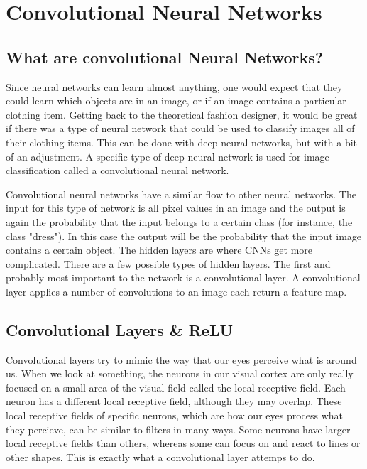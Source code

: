 \documentclass[12pt]{report} %
\begin{document}
\chapter{Convolutional Neural Networks}
\section{What are convolutional Neural Networks?}
	Since neural networks can learn almost anything, one would expect that they could learn which objects are in an image, or if an image contains a particular clothing item. Getting back to the theoretical fashion designer, it would be great if there was a type of neural network that could be used to classify images all of their clothing items. This can be done with deep neural networks, but with a bit of an adjustment. A specific type of deep neural network is used for image classification called a convolutional neural network. 

	Convolutional neural networks have a similar flow to other neural networks. The input for this type of network is all pixel values in an image and the output is again the probability that the input belongs to a certain class (for instance, the class "dress"). In this case the output will be the probability that the input image contains a certain object. The hidden layers are where CNNs get more complicated. There are a few possible types of hidden layers. The first and probably most important to the network is a convolutional layer. A convolutional layer applies a number of convolutions to an image each return a feature map\cite{aurelienMachineLearning}. 

\section{Convolutional Layers \& ReLU}
	
	Convolutional layers try to mimic the way that our eyes perceive what is around us. When we look at something, the neurons in our visual cortex are only really focused on a small area of the visual field called the local receptive field. Each neuron has a different local receptive field, although they may overlap. These local receptive fields of specific neurons, which are how our eyes process what they percieve, can be similar to filters in many ways. Some neurons have larger local receptive fields than others, whereas some can focus on and react to lines or other shapes. This is exactly what a convolutional layer attemps to do.\cite{aurelienMachineLearning} 
	
\end{document}
